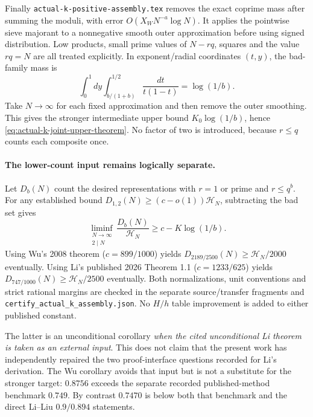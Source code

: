 Finally \texttt{actual-k-positive-assembly.tex} removes the exact
coprime mass after summing the moduli, with error
$O(X_WN^{-a}\log N)$. It applies the pointwise sieve majorant to
a nonnegative smooth outer approximation before using signed
distribution. Low products, small prime values of $N-rq$, squares
and the value $rq=N$ are all treated explicitly. In exponent/radial
coordinates $(t,y)$, the bad-family mass is
\[
 \int_0^1dy\int_{b/(1+b)}^{1/2}\frac{dt}{t(1-t)}=\log(1/b).
\]
Take $N\to\infty$ for each fixed approximation and then remove
the outer smoothing. This gives the stronger intermediate upper
bound $K_0\log(1/b)$, hence
\eqref{eq:actual-k-joint-upper-theorem}. No factor of two is
introduced, because $r\le q$ counts each composite once.

\paragraph{The lower-count input remains logically separate.}
Let $D_b(N)$ count the desired representations with $r=1$ or prime
and $r\le q^b$. For any established bound
$D_{1,2}(N)\ge(c-o(1))\mathcal H_N$, subtracting the bad set gives
\[
 \liminf_{\substack{N\to\infty\\2\mid N}}
 \frac{D_b(N)}{\mathcal H_N}\ge c-K\log(1/b).
\]
Using Wu's 2008 theorem ($c=899/1000$) yields
$D_{2189/2500}(N)\ge\mathcal H_N/2000$ eventually.
Using Li's published 2026 Theorem 1.1 ($c=1233/625$) yields
$D_{747/1000}(N)\ge\mathcal H_N/2500$ eventually.
Both normalizations, unit conventions and strict rational margins
are checked in the separate source/transfer fragments and
\texttt{certify\_actual\_k\_assembly.json}.
No $H/h$ table improvement is added to either published constant.

The latter is an unconditional corollary \emph{when the cited
unconditional Li theorem is taken as an external input}. This
does not claim that the present work has independently repaired
the two proof-interface questions recorded for Li's derivation.
The Wu corollary avoids that input but is not a substitute for
the stronger target: $0.8756$ exceeds the separate recorded
published-method benchmark $0.749$. By contrast $0.7470$ is below
both that benchmark and the direct Li--Liu $0.9/0.894$ statements.

